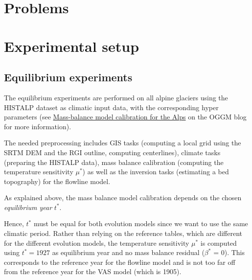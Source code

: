     




\section{Problems} %
\label{sec:problems}


\section{Experimental setup} %
\label{sec:experimental_setup}

    \subsection{Equilibrium experiments} %
    \label{sub:equilibrium_experiments}

        The equilibrium experiments are performed on all alpine glaciers using the HISTALP dataset \citep{Auer2007} as climatic input data, with the corresponding hyper parameters (see \href{https://oggm.org/2018/08/10/histalp-parameters/}{Mass-balance model calibration for the Alps} on the OGGM blog for more information).

        The needed preprocessing includes GIS tasks (computing a local grid using the SRTM DEM and the RGI outline, computing centerlines), climate tasks (preparing the HISTALP data), mass balance calibration (computing the temperature sensitivity $\mu^*$) as well as the inversion tasks (estimating a bed topography) for the flowline model.

        As explained above, the mass balance model calibration depends on the chosen \textit{equilibrium year} $t^*$.

        Hence, $t^*$ must be equal for both evolution models since we want to use the same climatic period. Rather than relying on the reference tables, which are different for the different evolution models, the temperature sensitivity $\mu^*$ is computed using $t^* = 1927$ as equilibrium year and no mass balance residual ($\beta^*$ = 0). This corresponds to the reference year for the flowline model and is not too far off from the reference year for the VAS model (which is 1905). 

